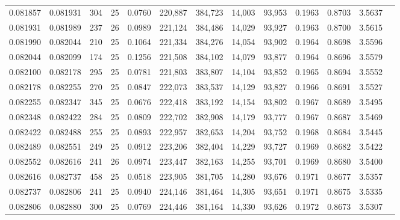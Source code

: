 \begin{tabular}{rrrrrrrrrrrrr}
0.081857 & 0.081931 &   304 &  25 &                                     0.0760 & 220,887 & 384,723 &  14,003 &  93,953 & 0.1963 & 0.8703 & 3.5637 \\
0.081931 & 0.081989 &   237 &  26 &                                     0.0989 & 221,124 & 384,486 &  14,029 &  93,927 & 0.1963 & 0.8700 & 3.5615 \\
0.081990 & 0.082044 &   210 &  25 &                                     0.1064 & 221,334 & 384,276 &  14,054 &  93,902 & 0.1964 & 0.8698 & 3.5596 \\
0.082044 & 0.082099 &   174 &  25 &                                     0.1256 & 221,508 & 384,102 &  14,079 &  93,877 & 0.1964 & 0.8696 & 3.5579 \\
0.082100 & 0.082178 &   295 &  25 &                                     0.0781 & 221,803 & 383,807 &  14,104 &  93,852 & 0.1965 & 0.8694 & 3.5552 \\
0.082178 & 0.082255 &   270 &  25 &                                     0.0847 & 222,073 & 383,537 &  14,129 &  93,827 & 0.1966 & 0.8691 & 3.5527 \\
0.082255 & 0.082347 &   345 &  25 &                                     0.0676 & 222,418 & 383,192 &  14,154 &  93,802 & 0.1967 & 0.8689 & 3.5495 \\
0.082348 & 0.082422 &   284 &  25 &                                     0.0809 & 222,702 & 382,908 &  14,179 &  93,777 & 0.1967 & 0.8687 & 3.5469 \\
0.082422 & 0.082488 &   255 &  25 &                                     0.0893 & 222,957 & 382,653 &  14,204 &  93,752 & 0.1968 & 0.8684 & 3.5445 \\
0.082489 & 0.082551 &   249 &  25 &                                     0.0912 & 223,206 & 382,404 &  14,229 &  93,727 & 0.1969 & 0.8682 & 3.5422 \\
0.082552 & 0.082616 &   241 &  26 &                                     0.0974 & 223,447 & 382,163 &  14,255 &  93,701 & 0.1969 & 0.8680 & 3.5400 \\
0.082616 & 0.082737 &   458 &  25 &                                     0.0518 & 223,905 & 381,705 &  14,280 &  93,676 & 0.1971 & 0.8677 & 3.5357 \\
0.082737 & 0.082806 &   241 &  25 &                                     0.0940 & 224,146 & 381,464 &  14,305 &  93,651 & 0.1971 & 0.8675 & 3.5335 \\
0.082806 & 0.082880 &   300 &  25 &                                     0.0769 & 224,446 & 381,164 &  14,330 &  93,626 & 0.1972 & 0.8673 & 3.5307 \\

\end{tabular}
